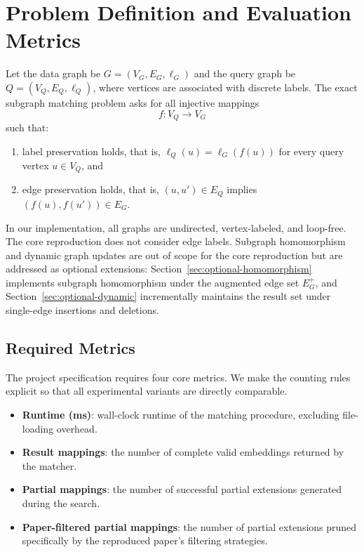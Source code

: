 \section{Problem Definition and Evaluation Metrics}
\label{sec:problem-def}

Let the data graph be $G = (V_G, E_G, \ell_G)$ and the query graph be $Q = (V_Q, E_Q, \ell_Q)$, where vertices are associated with discrete labels. The exact subgraph matching problem asks for all injective mappings
\[
f: V_Q \rightarrow V_G
\]
such that:
\begin{enumerate}[nosep]
  \item label preservation holds, that is, $\ell_Q(u) = \ell_G(f(u))$ for every query vertex $u \in V_Q$, and
  \item edge preservation holds, that is, $(u, u') \in E_Q$ implies $(f(u), f(u')) \in E_G$.
\end{enumerate}

In our implementation, all graphs are undirected, vertex-labeled, and loop-free. The core reproduction does not consider edge labels. Subgraph homomorphism and dynamic graph updates are out of scope for the core reproduction but are addressed as optional extensions: Section~\ref{sec:optional-homomorphism} implements subgraph homomorphism under the augmented edge set $E_G^+$, and Section~\ref{sec:optional-dynamic} incrementally maintains the result set under single-edge insertions and deletions.

\subsection{Required Metrics}

The project specification requires four core metrics. We make the counting rules explicit so that all experimental variants are directly comparable.

\begin{itemize}[nosep]
  \item \textbf{Runtime (ms)}: wall-clock runtime of the matching procedure, excluding file-loading overhead.
  \item \textbf{Result mappings}: the number of complete valid embeddings returned by the matcher.
  \item \textbf{Partial mappings}: the number of successful partial extensions generated during the search.
  \item \textbf{Paper-filtered partial mappings}: the number of partial extensions pruned specifically by the reproduced paper's filtering strategies.
\end{itemize}

